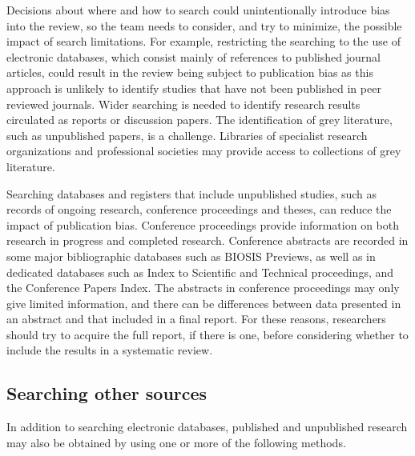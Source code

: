 \documentclass[
  11pt,
  a4paper,
  DIV=11,
  numbers=noendperiod]{scrreprt}
\begin{document}
Decisions about where and how to search could unintentionally introduce
bias into the review, so the team needs to consider, and try to
minimize, the possible impact of search limitations. For example,
restricting the searching to the use of electronic databases, which
consist mainly of references to published journal articles, could result
in the review being subject to publication bias as this approach is
unlikely to identify studies that have not been published in peer
reviewed journals. Wider searching is needed to identify research
results circulated as reports or discussion papers. The identification
of grey literature, such as unpublished papers, is a challenge.
Libraries of specialist research organizations and professional
societies may provide access to collections of grey literature.

Searching databases and registers that include unpublished studies, such
as records of ongoing research, conference proceedings and theses, can
reduce the impact of publication bias. Conference proceedings provide
information on both research in progress and completed research.
Conference abstracts are recorded in some major bibliographic databases
such as BIOSIS Previews, as well as in dedicated databases such as Index
to Scientific and Technical proceedings, and the Conference Papers
Index. The abstracts in conference proceedings may only give limited
information, and there can be differences between data presented in an
abstract and that included in a final report. For these reasons,
researchers should try to acquire the full report, if there is one,
before considering whether to include the results in a systematic
review.

\subsection{Searching other sources}\label{searching-other-sources}

In addition to searching electronic databases, published and unpublished
research may also be obtained by using one or more of the following
methods.
\end{document}
